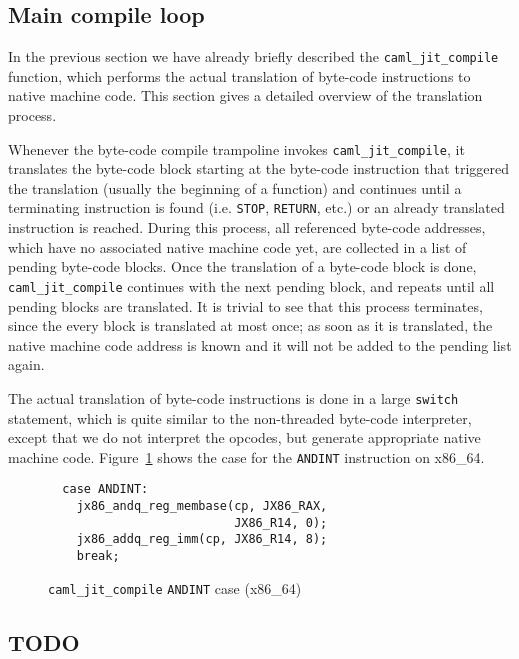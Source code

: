 \documentclass[10pt,a4paper,twocolumn]{article}
\begin{document}
\subsection{Main compile loop}

In the previous section we have already briefly described the \texttt{caml\_jit\_compile} function,
which performs the actual translation of byte-code instructions to native machine code. This section
gives a detailed overview of the translation process.

Whenever the byte-code compile trampoline invokes \texttt{caml\_jit\_compile}, it translates the byte-code
block starting at the byte-code instruction that triggered the translation (usually the beginning of a function)
and continues until a terminating instruction is found (i.e. \texttt{STOP}, \texttt{RETURN}, etc.) or an already
translated instruction is reached. During this process, all referenced byte-code addresses, which have no associated 
native machine code yet, are collected in a list of pending byte-code blocks. Once the translation of a byte-code
block is done, \texttt{caml\_jit\_compile} continues with the next pending block, and repeats until
all pending blocks are translated. It is trivial to see that this process terminates, since the
every block is translated at most once; as soon as it is translated, the native machine code address
is known and it will not be added to the pending list again.

The actual translation of byte-code instructions is done in a large \texttt{switch} statement, which is
quite similar to the non-threaded byte-code interpreter, except that we do not interpret the opcodes,
but generate appropriate native machine code. Figure~\ref{figure:caml_jit_compile_ANDINT} shows the 
case for the \texttt{ANDINT} instruction on x86\_64.

\begin{figure}[ht]
  \centering
  \begin{verbatim}
  case ANDINT:
    jx86_andq_reg_membase(cp, JX86_RAX,
                          JX86_R14, 0);
    jx86_addq_reg_imm(cp, JX86_R14, 8);
    break;
\end{verbatim}
  \caption{\texttt{caml\_jit\_compile} \texttt{ANDINT} case (x86\_64)}
  \label{figure:caml_jit_compile_ANDINT}
\end{figure}

\subsection{TODO}
\end{document}
